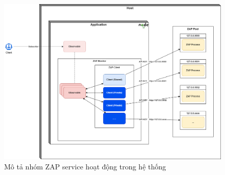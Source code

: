 \begin{figure}[H]
      \centering
      \includegraphics[width=\textwidth]{applied-thesis-chapters/chapter-3/Mô tả nhóm ZAP service hoạt động trong hệ thống.png}
      \caption{Mô tả nhóm ZAP service hoạt động trong hệ thống}
      \label{fig:NhomZapServiceHoatDong}
\end{figure}

